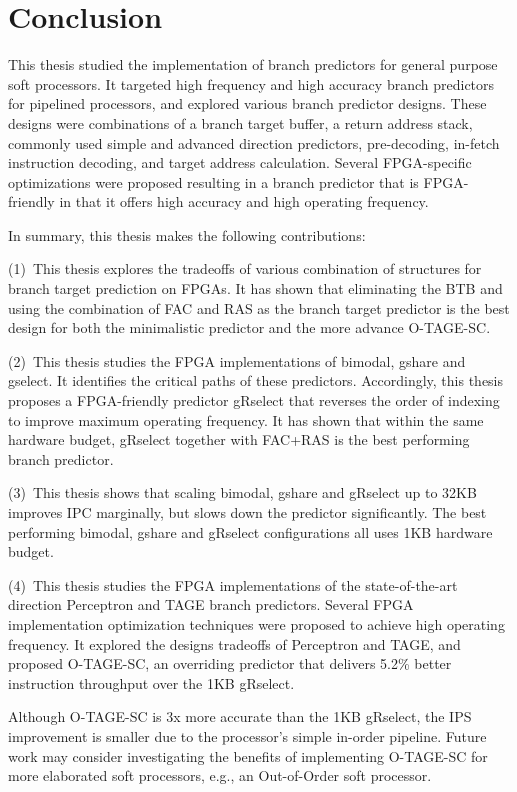 \chapter{Conclusion}
\label{chap:conclusion}

This thesis studied the implementation of branch predictors for general purpose soft processors. It targeted high frequency and high accuracy branch predictors for pipelined processors, and explored various branch predictor designs. These designs were combinations of a branch target buffer, a return address stack, commonly used simple and advanced direction predictors, pre-decoding, in-fetch instruction decoding, and target address calculation. Several FPGA-specific optimizations were proposed resulting in a branch predictor that is FPGA-friendly in that it offers high accuracy and high operating frequency.

In summary, this thesis makes the following contributions:

(1)~This thesis explores the tradeoffs of various combination of structures for branch target prediction on FPGAs. It has shown that eliminating the BTB and using the combination of FAC and RAS as the branch target predictor is the best design for both the minimalistic predictor and the more advance \mbox{O-TAGE-SC}.

(2)~This thesis studies the FPGA implementations of bimodal, gshare and gselect. It identifies the critical paths of these predictors. Accordingly, this thesis proposes a FPGA-friendly predictor gRselect that reverses the order of indexing to improve maximum operating frequency. It has shown that within the same hardware budget, gRselect together with FAC+RAS is the best performing branch predictor.

(3)~This thesis shows that scaling bimodal, gshare and gRselect up to 32KB improves IPC marginally, but slows down the predictor significantly. The best performing bimodal, gshare and gRselect configurations all uses 1KB hardware budget.

(4)~This thesis studies the FPGA implementations of the state-of-the-art direction Perceptron and TAGE branch predictors. Several FPGA implementation optimization techniques were proposed to achieve high operating frequency. It explored the designs tradeoffs of Perceptron and TAGE, and proposed \mbox{O-TAGE-SC}, an overriding predictor that delivers 5.2\% better instruction throughput over the 1KB gRselect.

Although \mbox{O-TAGE-SC} is \mytilde 3x more accurate than the 1KB gRselect, the IPS improvement is  smaller due to the processor's simple in-order pipeline. Future work may consider investigating the benefits of implementing \mbox{O-TAGE-SC} for more elaborated soft processors, e.g., an Out-of-Order soft processor. 
